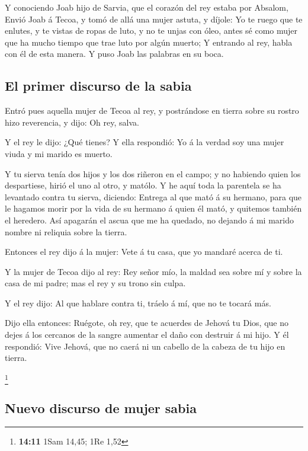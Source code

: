  Y conociendo Joab hijo de Sarvia, que el corazón del rey
estaba por Absalom,  Envió Joab á Tecoa, y tomó de allá una
mujer astuta, y díjole: Yo te ruego que te enlutes, y te vistas de ropas
de luto, y no te unjas con óleo, antes sé como mujer que ha mucho tiempo
que trae luto por algún muerto;  Y entrando al rey, habla
con él de esta manera. Y puso Joab las palabras en su boca.

\hypertarget{el-primer-discurso-de-la-sabia}{%
\subsection{El primer discurso de la
sabia}\label{el-primer-discurso-de-la-sabia}}

 Entró pues aquella mujer de Tecoa al rey, y postrándose en
tierra sobre su rostro hizo reverencia, y dijo: Oh rey, salva.

 Y el rey le dijo: ¿Qué tienes? Y ella respondió: Yo á la
verdad soy una mujer viuda y mi marido es muerto.

 Y tu sierva tenía dos hijos y los dos riñeron en el campo;
y no habiendo quien los despartiese, hirió el uno al otro, y matólo.
 Y he aquí toda la parentela se ha levantado contra tu
sierva, diciendo: Entrega al que mató á su hermano, para que le hagamos
morir por la vida de su hermano á quien él mató, y quitemos también el
heredero. Así apagarán el ascua que me ha quedado, no dejando á mi
marido nombre ni reliquia sobre la tierra.

 Entonces el rey dijo á la mujer: Vete á tu casa, que yo
mandaré acerca de ti.

 Y la mujer de Tecoa dijo al rey: Rey señor mío, la maldad
sea sobre mí y sobre la casa de mi padre; mas el rey y su trono sin
culpa.

 Y el rey dijo: Al que hablare contra ti, tráelo á mí, que
no te tocará más.

 Dijo ella entonces: Ruégote, oh rey, que te acuerdes de
Jehová tu Dios, que no dejes á los cercanos de la sangre aumentar el
daño con destruir á mi hijo. Y él respondió: Vive Jehová, que no caerá
ni un cabello de la cabeza de tu hijo en tierra.

\footnote{\textbf{14:11} 1Sam 14,45; 1Re 1,52}

\hypertarget{nuevo-discurso-de-mujer-sabia}{%
\subsection{Nuevo discurso de mujer
sabia}\label{nuevo-discurso-de-mujer-sabia}}

